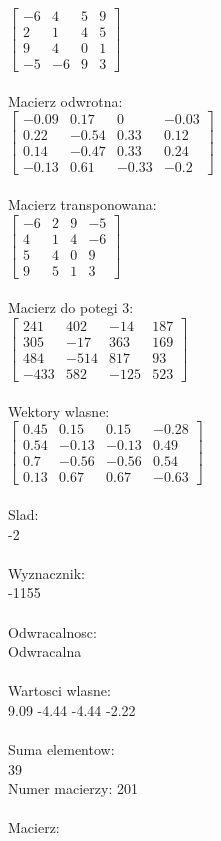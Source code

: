 \documentclass[a4paper,12pt]{article}
\begin{document}
$\begin{bmatrix} -6&4&5&9\\2&1&4&5\\9&4&0&1\\-5&-6&9&3 \end{bmatrix}$
\\
\\
Macierz odwrotna:\\

$\begin{bmatrix} -0.09&0.17&0&-0.03\\0.22&-0.54&0.33&0.12\\0.14&-0.47&0.33&0.24\\-0.13&0.61&-0.33&-0.2 \end{bmatrix}$
\\
\\
Macierz transponowana:\\

$\begin{bmatrix} -6&2&9&-5\\4&1&4&-6\\5&4&0&9\\9&5&1&3 \end{bmatrix}$
\\
\\
Macierz do potegi 3:\\

$\begin{bmatrix} 241&402&-14&187\\305&-17&363&169\\484&-514&817&93\\-433&582&-125&523 \end{bmatrix}$
\\
\\
Wektory wlasne:\\

$\begin{bmatrix} 0.45&0.15&0.15&-0.28\\0.54&-0.13&-0.13&0.49\\0.7&-0.56&-0.56&0.54\\0.13&0.67&0.67&-0.63 \end{bmatrix}$
\\
\\
Slad:\\
-2
\\
\\
Wyznacznik:\\
-1155
\\
\\
Odwracalnosc:\\
Odwracalna
\\
\\
Wartosci wlasne:\\
9.09 -4.44 -4.44 -2.22
\\
\\
Suma elementow:\\
39
\\
\newpage
Numer macierzy:
201
\\
\\
Macierz:\\
\end{document}
